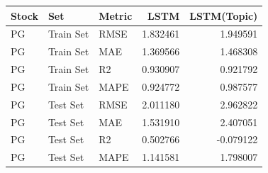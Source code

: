 \begin{tabular}{lllrr}
\toprule
Stock & Set & Metric & LSTM & LSTM(Topic) \\
\midrule
PG & Train Set & RMSE & 1.832461 & 1.949591 \\
PG & Train Set & MAE & 1.369566 & 1.468308 \\
PG & Train Set & R2 & 0.930907 & 0.921792 \\
PG & Train Set & MAPE & 0.924772 & 0.987577 \\
PG & Test Set & RMSE & 2.011180 & 2.962822 \\
PG & Test Set & MAE & 1.531910 & 2.407051 \\
PG & Test Set & R2 & 0.502766 & -0.079122 \\
PG & Test Set & MAPE & 1.141581 & 1.798007 \\
\bottomrule
\end{tabular}
